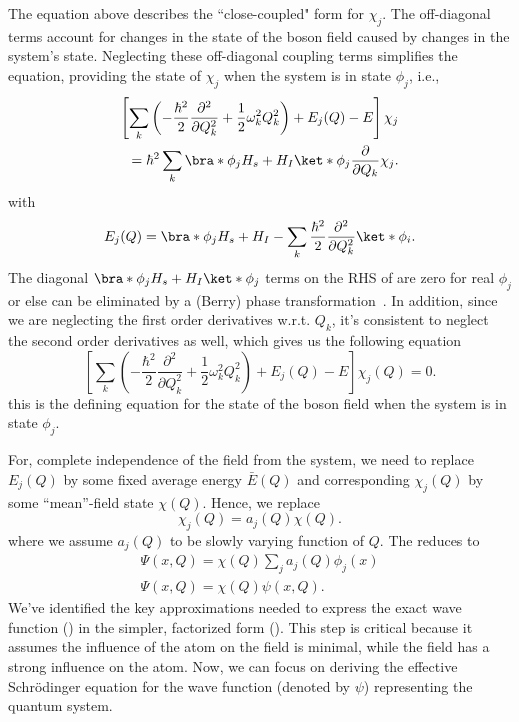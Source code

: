 The equation above describes the ``close-coupled" form for \(\chi_j\). 
The off-diagonal terms account for changes in the state of the boson
field caused by changes in the system's state. Neglecting these 
off-diagonal coupling terms simplifies the equation, providing 
the state of \(\chi_j\) when the system is in state \(\phi_j\), i.e., 
\begin{equation}
    \begin{aligned}
        \label{eq:class_jcm_eq6}
    \left[\sum_k \left(-\frac{\hbar^2}{2}\dfrac{\partial^2}{\partial Q_k^2}
    + \frac{1}{2} \omega_k^2 Q_k^2\right)
    + E_j(Q) - E \right]\chi_j \\
    = \hbar^2 \sum_k \bra*{\phi_j}H_s + H_I \ket*{\phi_j}\dfrac{\partial}{\partial Q_k}\chi_j.
    \end{aligned}
\end{equation}
with 
\begin{eqnarray}
    E_j(Q) = \bra*{\phi_j}H_s + H_I - \sum_k \frac{\hbar^2}{2} \dfrac{\partial^2}{\partial Q_k^2} \ket*{\phi_i}.
\end{eqnarray}
The diagonal \(\bra*{\phi_j}H_s + H_I \ket*{\phi_j}\) terms on the RHS of 
are zero for real \(\phi_j\) or else can be eliminated by a (Berry) phase transformation~\cite{braun2004classical}.
In addition, since we are neglecting the first order derivatives w.r.t. $Q_k$, it's consistent to neglect
the second order derivatives as well, which gives us the following equation
\begin{equation}
    \label{eq:class_jcm_eq7}
    \left[\sum_k \left(-\frac{\hbar^2}{2}\dfrac{\partial^2}{\partial Q_k^2}
    + \frac{1}{2} \omega_k^2 Q_k^2\right)
    + E_j(Q) - E \right]\chi_j (Q)= 0.
\end{equation}
this is the defining equation for the state of the boson field when the system is in state \(\phi_j\).

For, complete independence of the field from the system, we need to replace 
\(E_j(Q)\) by some fixed average energy \(\bar{E}(Q)\) and corresponding 
\(\chi_j(Q)\) by some ``mean''-field state \({\chi}(Q)\). Hence, we replace 
\begin{equation}
    \label{eq:class_jcm_eq8}
    \chi_j(Q) = a_j(Q) \chi(Q).
\end{equation}
where we assume \(a_j(Q)\) to be slowly varying function of \(Q\). The 
reduces to
\begin{align}
    \label{eq:class_jcm_eq9}
    \Psi(x, Q) = \chi(Q) \sum_j a_j(Q) \phi_j(x) \nonumber \\
    \Psi(x, Q) =  \chi(Q)  \psi(x, Q).
\end{align}
We've identified the key approximations needed to express the exact wave function 
() in the simpler, factorized form (). 
This step is critical because it assumes the influence of the atom on the field is minimal, while the 
field has a strong influence on the atom. Now, we can focus on deriving the effective 
Schrödinger equation for the wave function (denoted by \(\psi\)) representing the quantum system.

